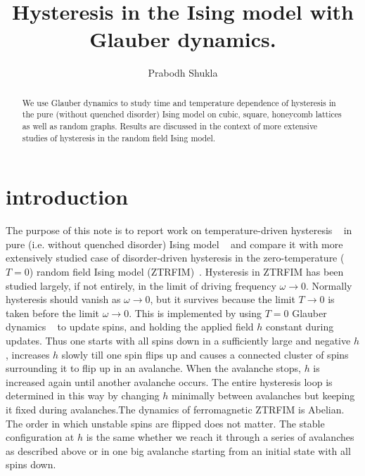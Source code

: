 \documentclass[a4,aps,amsmath,floatfix,nofootinbib,10pt]{revtex4}
\begin{document}
\title{Hysteresis in the Ising model with Glauber dynamics.}

\author{Prabodh Shukla}



\begin{abstract}

We use Glauber dynamics to study time and temperature dependence of 
hysteresis in the pure (without quenched disorder) Ising model on 
cubic, square, honeycomb lattices as well as random graphs. Results are 
discussed in the context of more extensive studies of hysteresis in the 
random field Ising model.

\end{abstract}

\maketitle

\section{introduction}

The purpose of this note is to report work on temperature-driven 
hysteresis ~\cite{bertotti} in pure (i.e. without quenched disorder) 
Ising model ~\cite{ising,onsager} and compare it with more extensively 
studied case of disorder-driven hysteresis in the zero-temperature 
($T=0$) random field Ising model (ZTRFIM)~\cite{sethna1, maritan, 
sethna2, dhar, sethna3, perez, sethna4, xavier, rosinberg, liu, 
spasojevic, balog, shukla}. Hysteresis in ZTRFIM has been studied 
largely, if not entirely, in the limit of driving frequency $\omega \to 
0$. Normally hysteresis should vanish as $\omega \to 0$, but it 
survives because the limit $T \to 0$ is taken before the limit $\omega 
\to 0$. This is implemented by using $T=0$ Glauber dynamics 
~\cite{glauber} to update spins, and holding the applied field $h$ 
constant during updates. Thus one starts with all spins down in a 
sufficiently large and negative $h$, increases $h$ slowly till one spin 
flips up and causes a connected cluster of spins surrounding it to flip 
up in an avalanche. When the avalanche stops, $h$ is increased again 
until another avalanche occurs. The entire hysteresis loop is 
determined in this way by changing $h$ minimally between avalanches but 
keeping it fixed during avalanches.The dynamics of ferromagnetic ZTRFIM 
is Abelian. The order in which unstable spins are flipped does not 
matter. The stable configuration at $h$ is the same whether we reach it 
through a series of avalanches as described above or in one big 
avalanche starting from an initial state with all spins down.
\end{document}
